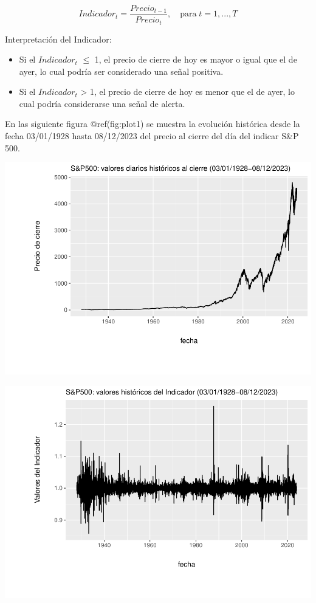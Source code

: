 \documentclass[
  12pt]{article}
\begin{document}
\begin{equation}
Indicador_t=\frac{Precio_{t-1}}{Precio_t},\quad\text{para}\; t=1,...,T \label{eq:ind}
\end{equation} \vspace{0.5cm}

Interpretación del Indicador:

\begin{itemize}
\item Si el $Indicador_t$    $\leq$ 1, el precio de cierre de hoy es mayor o igual que el de ayer, lo cual podría ser considerado una señal positiva.
\item Si el $Indicador_t$ > 1, el precio de cierre de hoy es menor que el de ayer, lo cual podría considerarse una señal de alerta.
\end{itemize}

\vspace{1cm}

En las siguiente figura @ref(fig:plot1) se muestra la evolución
histórica desde la fecha 03/01/1928 hasta 08/12/2023 del precio al
cierre del día del indicar S\&P 500.

\includegraphics{extremales_files/figure-latex/plot1-1.pdf}

\includegraphics{extremales_files/figure-latex/plot2-1.pdf} \newpage
\end{document}
